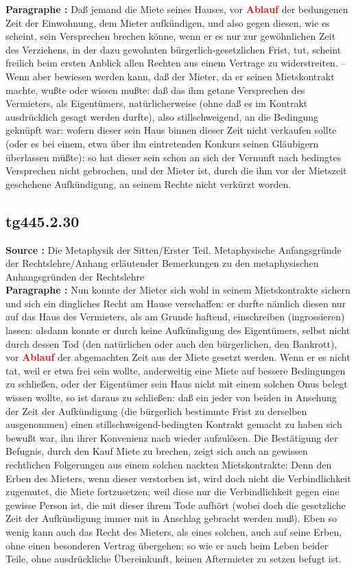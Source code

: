 \documentclass[a4paper,12pt,twoside]{book}
\newcommand{\match}[1]{\textcolor{red}{\textbf{#1}}}
\begin{document}
	\textbf{Paragraphe : }Daß jemand die Miete seines Hauses, vor \match{Ablauf} der bedungenen Zeit der Einwohnung, dem Mieter aufkündigen, und also gegen diesen, wie es scheint, sein Versprechen brechen könne, wenn er es nur zur gewöhnlichen Zeit des Verziehens, in der dazu gewohnten bürgerlich-gesetzlichen Frist, tut, scheint freilich beim ersten Anblick allen Rechten aus einem Vertrage zu widerstreiten. – Wenn aber bewiesen werden kann, daß der Mieter, da er seinen Mietskontrakt machte, wußte oder wissen  mußte: daß das ihm getane Versprechen des Vermieters, als Eigentümers, natürlicherweise (ohne daß es im Kontrakt ausdrücklich gesagt werden durfte), also stillschweigend, an die Bedingung geknüpft war: wofern dieser sein Haus binnen dieser Zeit nicht verkaufen sollte (oder es bei einem, etwa über ihn eintretenden Konkurs seinen Gläubigern überlassen müßte): so hat dieser sein schon an sich der Vernunft nach bedingtes Versprechen nicht gebrochen, und der Mieter ist, durch die ihm vor der Mietszeit geschehene Aufkündigung, an seinem Rechte nicht verkürzt worden. 
	
	\subsection*{tg445.2.30} 
	\textbf{Source : }Die Metaphysik der Sitten/Erster Teil. Metaphysische Anfangsgründe der Rechtslehre/Anhang erläutender Bemerkungen zu den metaphysischen Anhangsgründen der Rechtslehre\\  
	
	\textbf{Paragraphe : }Nun konnte der Mieter sich wohl in seinem Mietskontrakte sichern und sich ein dingliches Recht am Hause verschaffen: er durfte nämlich diesen nur auf das Haus des Vermieters, als am Grunde haftend, einschreiben (ingrossieren) lassen: alsdann konnte er durch keine Aufkündigung des Eigentümers, selbst nicht durch dessen Tod (den natürlichen oder auch den bürgerlichen, den Bankrott), vor \match{Ablauf} der abgemachten Zeit aus der Miete gesetzt werden. Wenn er es nicht tat, weil er etwa frei sein wollte, anderweitig eine Miete auf bessere Bedingungen zu schließen, oder der Eigentümer sein Haus nicht mit einem solchen Onus belegt wissen wollte, so ist daraus zu schließen: daß ein jeder von beiden in Ansehung der Zeit der Aufkündigung (die bürgerlich bestimmte Frist zu derselben ausgenommen) einen stillschweigend-bedingten Kontrakt gemacht zu haben sich bewußt war, ihn ihrer Konvenienz nach wieder aufzulösen. Die Bestätigung der Befugnis, durch den Kauf Miete zu brechen, zeigt sich auch an gewissen rechtlichen Folgerungen aus einem solchen nackten Mietskontrakte: Denn den Erben des Mieters, wenn dieser verstorben ist, wird doch nicht die Verbindlichkeit zugemutet, die Miete fortzusetzen; weil diese nur die Verbindlichkeit gegen eine gewisse Person ist, die mit dieser ihrem Tode aufhört (wobei  doch die gesetzliche Zeit der Aufkündigung immer mit in Anschlag gebracht werden muß). Eben so wenig kann auch das Recht des Mieters, als eines solchen, auch auf seine Erben, ohne einen besonderen Vertrag übergehen; so wie er auch beim Leben beider Teile, ohne ausdrückliche Übereinkunft, keinen Aftermieter zu setzen befugt ist. 
	
\end{document}
